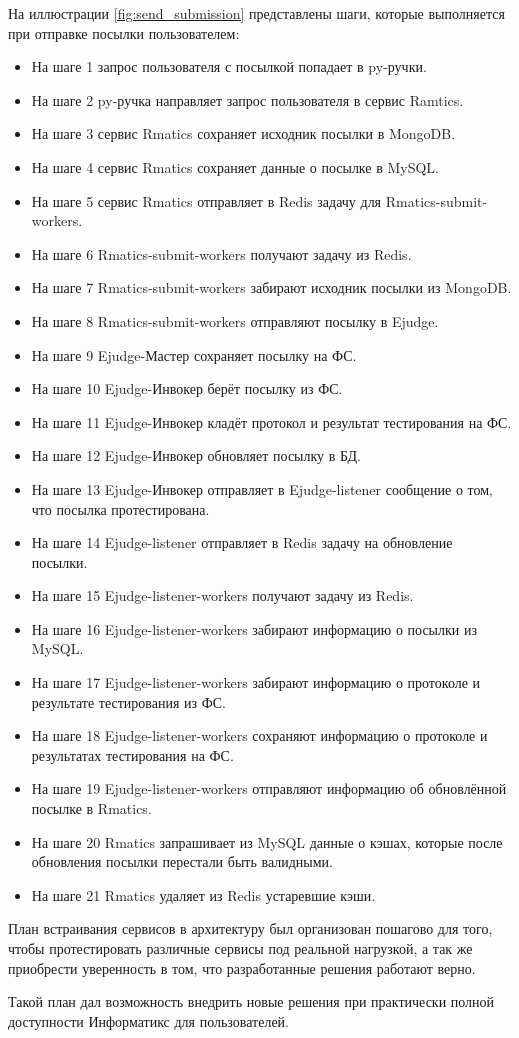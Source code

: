 На иллюстрации \ref{fig:send_submission} представлены шаги, которые выполняется при отправке посылки пользователем:

\begin{itemize}
    \item На шаге 1 запрос пользователя с посылкой попадает в py-ручки.
    \item На шаге 2 py-ручка направляет запрос пользователя в сервис Ramtics.
    \item На шаге 3 сервис Rmatics сохраняет исходник посылки в MongoDB.
    \item На шаге 4 сервис Rmatics сохраняет данные о посылке в MySQL.
    \item На шаге 5 сервис Rmatics отправляет в Redis задачу для Rmatics-submit-workers.
    \item На шаге 6 Rmatics-submit-workers получают задачу из Redis.
    \item На шаге 7 Rmatics-submit-workers забирают исходник посылки из MongoDB.
    \item На шаге 8 Rmatics-submit-workers отправляют посылку в Ejudge.
    \item На шаге 9 Ejudge-Мастер сохраняет посылку на ФС.
    \item На шаге 10 Ejudge-Инвокер берёт посылку из ФС.
    \item На шаге 11 Ejudge-Инвокер кладёт протокол и результат тестирования на ФС.
    \item На шаге 12 Ejudge-Инвокер обновляет посылку в БД.
    \item На шаге 13 Ejudge-Инвокер отправляет в Ejudge-listener сообщение о том, что посылка протестирована.
    \item На шаге 14 Ejudge-listener отправляет в Redis задачу на обновление посылки.
    \item На шаге 15 Ejudge-listener-workers получают задачу из Redis.
    \item На шаге 16 Ejudge-listener-workers забирают информацию о посылки из MySQL.
    \item На шаге 17 Ejudge-listener-workers забирают информацию о протоколе и результате тестирования из ФС.
    \item На шаге 18 Ejudge-listener-workers сохраняют информацию о протоколе и результатах тестирования на ФС.
    \item На шаге 19 Ejudge-listener-workers отправляют информацию об обновлённой посылке в Rmatics.
    \item На шаге 20 Rmatics запрашивает из MySQL данные о кэшах, которые после обновления посылки перестали быть валидными.
    \item На шаге 21 Rmatics удаляет из Redis устаревшие кэши.
\end{itemize}

План встраивания сервисов в архитектуру был организован пошагово для того,
чтобы протестировать различные сервисы под реальной нагрузкой,
а так же приобрести уверенность в том, что разработанные решения работают верно.

Такой план дал возможность внедрить новые решения при практически полной доступности Информатикс для пользователей.
